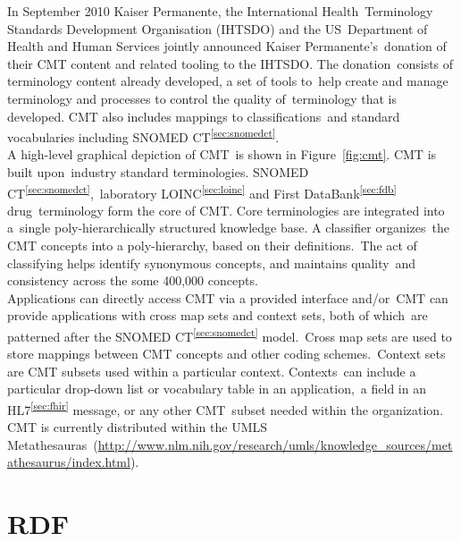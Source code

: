 \documentclass[DIV=calc, paper=a4, fontsize=12pt, onecolumn]{scrartcl}	 %
\begin{document}
  \noindent In September 2010 Kaiser Permanente, the International Health\
  Terminology Standards Development Organisation (IHTSDO) and the US\
  Department of Health and Human Services jointly announced Kaiser Permanente's\
  donation of their CMT content and related tooling to the IHTSDO. The donation\
  consists of terminology content already developed, a set of tools to\
  help create and manage terminology and processes to control the quality of\
  terminology that is developed. CMT also includes mappings to classifications\
  and standard vocabularies including SNOMED CT\textsuperscript{\ref{sec:snomedct}}.\\
  
  \noindent A high-level graphical depiction of CMT\
  is shown in Figure~\ref{fig:cmt}. CMT is built upon\
  industry standard terminologies. SNOMED CT\textsuperscript{\ref{sec:snomedct}},\
  laboratory LOINC\textsuperscript{\ref{sec:loinc}} and First DataBank\textsuperscript{\ref{sec:fdb}} drug\
  terminology form the core of CMT. Core terminologies are integrated into a\
  single poly-hierarchically structured knowledge base. A classifier organizes\
  the CMT concepts into a poly-hierarchy, based on their definitions.\
  The act of classifying helps identify synonymous concepts, and maintains quality\
  and consistency across the some 400,000 concepts.\\
  
  \noindent Applications can directly access CMT via a provided interface and/or\
  CMT can provide applications with cross map sets and context sets, both of which\
  are patterned after the SNOMED CT\textsuperscript{\ref{sec:snomedct}} model.\
  Cross map sets are used to store mappings between CMT concepts and other coding schemes.\
  Context sets are CMT subsets used within a particular context. Contexts\
  can include a particular drop-down list or vocabulary table in an application,\
  a field in an HL7\textsuperscript{\ref{sec:fhir}} message, or any other CMT\
  subset needed within the organization.\\
  
  \noindent CMT is currently distributed within the UMLS Metathesauras\
  (\url{http://www.nlm.nih.gov/research/umls/knowledge_sources/metathesaurus/index.html}).
  
  


 \section[Resource Description Framework (RDF)]{RDF}
  \label{sec:rdf}
\end{document}
